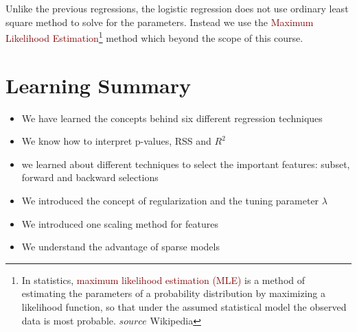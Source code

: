 \documentclass{tufte-handout}
\newcommand{\hlred}[1]{\textcolor{Maroon}{#1}}%
\begin{document}
Unlike the previous regressions, the logistic regression does not use ordinary least square method to solve for the parameters. Instead we use the \hlred{Maximum Likelihood Estimation}\footnote{In statistics, \hlred{maximum likelihood estimation (MLE)} is a method of estimating the parameters of a probability distribution by maximizing a likelihood function, so that under the assumed statistical model the observed data is most probable. $source$ Wikipedia} method which beyond the scope of this course.

\section{Learning Summary}

\begin{itemize}
    \item We have learned the concepts behind six different regression techniques
    \item We know how to interpret p-values, RSS and \(R^2\)
    \item we learned about different techniques to select the important features: subset, forward and backward selections
    \item We introduced the concept of regularization and the tuning parameter \(\lambda\)
    \item We introduced one scaling method for features
    \item We understand the advantage of sparse models
\end{itemize}



\end{document}
